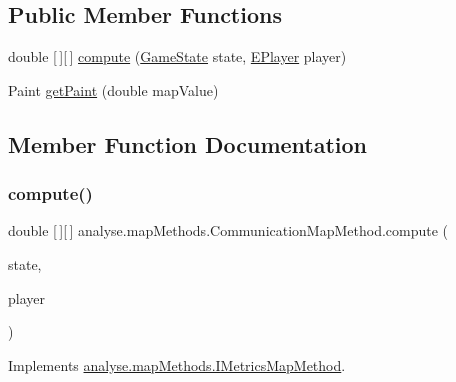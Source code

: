\subsection*{Public Member Functions}
\begin{DoxyCompactItemize}
\item 
double \mbox{[}$\,$\mbox{]}\mbox{[}$\,$\mbox{]} \mbox{\hyperlink{classanalyse_1_1map_methods_1_1_communication_map_method_a9e617c1890ad709390adc27497bfd6ea}{compute}} (\mbox{\hyperlink{classgame_1_1game_state_1_1_game_state}{Game\+State}} state, \mbox{\hyperlink{enumgame_1_1_e_player}{E\+Player}} player)
\item 
Paint \mbox{\hyperlink{classanalyse_1_1map_methods_1_1_communication_map_method_ac51687c49fddaa463b261af6b17d9b65}{get\+Paint}} (double map\+Value)
\end{DoxyCompactItemize}


\subsection{Member Function Documentation}
\mbox{\label{classanalyse_1_1map_methods_1_1_communication_map_method_a9e617c1890ad709390adc27497bfd6ea}} 
\subsubsection{\texorpdfstring{compute()}{compute()}}
{\footnotesize\ttfamily double \mbox{[}$\,$\mbox{]}\mbox{[}$\,$\mbox{]} analyse.\+map\+Methods.\+Communication\+Map\+Method.\+compute (\begin{DoxyParamCaption}\item[{\mbox{\hyperlink{classgame_1_1game_state_1_1_game_state}{Game\+State}}}]{state,  }\item[{\mbox{\hyperlink{enumgame_1_1_e_player}{E\+Player}}}]{player }\end{DoxyParamCaption})\hspace{0.3cm}{\ttfamily [inline]}}



Implements \mbox{\hyperlink{interfaceanalyse_1_1map_methods_1_1_i_metrics_map_method_aef15b826032a8cc1140563d539dd1319}{analyse.\+map\+Methods.\+I\+Metrics\+Map\+Method}}.

